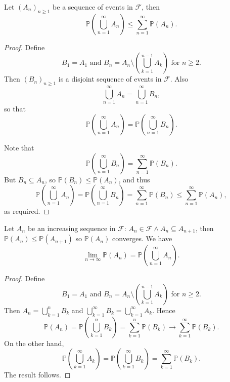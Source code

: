 \begin{proposition}\label{prop:Countable subadditivity}
    Let $ (A_n)_{n\ge 1} $ be a sequence of events in $ \mathcal{F} $, then 
\[
    \mathbb{P}\left( \bigcup_{n=1}^{\infty}A_n \right)\le \sum_{n=1}^{\infty}\mathbb{P}(A_n).
\]
\end{proposition}
\begin{proof}
    Define 
    \[
        B_1=A_1 \text{ and } B_n = A_n \setminus \left( \bigcup_{k=1}^{n-1}A_k \right)\text{ for }n\ge 2.
    \]
    Then $ (B_n)_{n\ge 1} $ is a disjoint sequence of events in $ \mathcal{F} $. Also
    \[
        \bigcup_{n=1}^{\infty}A_n=\bigcup_{n=1}^{\infty}B_n,
    \]
    so that
    \[
        \mathbb{P}\left( \bigcup_{n=1}^{\infty}A_n \right) = \mathbb{P}\left( \bigcup_{n=1}^{\infty}B_n \right).
    \]
    
    Note that 
    \[
        \mathbb{P}\left( \bigcup_{n=1}^{\infty}B_n \right) = \sum_{n=1}^{\infty}\mathbb{P}(B_n).
    \]
    But $ B_n \subseteq A_n $, so $ \mathbb{P}(B_n)\le \mathbb{P}(A_n) $, and thus 
    \[
        \mathbb{P}\left( \bigcup_{n=1}^{\infty}A_n \right) = \mathbb{P}\left( \bigcup_{n=1}^{\infty}B_n \right)=\sum_{n=1}^{\infty}\mathbb{P}(B_n)\le \sum_{n=1}^{\infty}\mathbb{P}(A_n),
    \]
    as required.
\end{proof}

\begin{proposition}[Continuity]\label{prop:continuity}
    Let $A_n$ be an increasing sequence in $ \mathcal{F} $: $ A_{n}\in \mathcal{F} \land A_n \subseteq A_{n+1} $, then $ \mathbb{P}(A_n) \le \mathbb{P}(A_{n+1}) $ so $ \mathbb{P}(A_n) $ converges. We have
    \[
        \lim_{n \to \infty} \mathbb{P}(A_n) = \mathbb{P}\left( \bigcup_{n=1}^{\infty}A_n \right).
    \]
\end{proposition}
\begin{proof}
    Define 
    \[
        B_1=A_1 \text{ and } B_n = A_n \setminus \left( \bigcup_{k=1}^{n-1}A_k \right)\text{ for }n\ge 2.
    \]
    Then $ A_n = \bigcup_{k=1}^{n}B_k $ and $ \bigcup_{k=1}^{\infty}B_k= \bigcup_{k=1}^{\infty}A_k$. Hence 
    \[
        \mathbb{P}(A_n) = \mathbb{P}\left( \bigcup_{k=1}^{n}B_k \right) = \sum_{k=1}^{n}\mathbb{P}(B_k)\to \sum_{k=1}^{\infty}\mathbb{P}(B_k).
    \]
    On the other hand,
    \[
        \mathbb{P}\left( \bigcup_{k=1}^{\infty}A_k \right)=\mathbb{P}\left( \bigcup_{k=1}^{\infty}B_k \right) = \sum_{k=1}^{\infty}\mathbb{P}(B_k).
    \]
    The result follows.
\end{proof}

